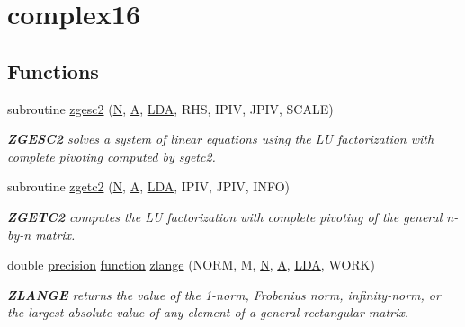 \hypertarget{group__complex16GEauxiliary}{}\section{complex16}
\label{group__complex16GEauxiliary}
\subsection*{Functions}
\begin{DoxyCompactItemize}
\item 
subroutine \hyperlink{group__complex16GEauxiliary_ga9adcef3bc45139ea3693275252880c29}{zgesc2} (\hyperlink{polmisc_8c_a0240ac851181b84ac374872dc5434ee4}{N}, \hyperlink{classA}{A}, \hyperlink{example__user_8c_ae946da542ce0db94dced19b2ecefd1aa}{L\+D\+A}, R\+H\+S, I\+P\+I\+V, J\+P\+I\+V, S\+C\+A\+L\+E)
\begin{DoxyCompactList}\small\item\em {\bfseries Z\+G\+E\+S\+C2} solves a system of linear equations using the L\+U factorization with complete pivoting computed by sgetc2. \end{DoxyCompactList}\item 
subroutine \hyperlink{group__complex16GEauxiliary_gae5d1dc8c626b248e836d865f428aa399}{zgetc2} (\hyperlink{polmisc_8c_a0240ac851181b84ac374872dc5434ee4}{N}, \hyperlink{classA}{A}, \hyperlink{example__user_8c_ae946da542ce0db94dced19b2ecefd1aa}{L\+D\+A}, I\+P\+I\+V, J\+P\+I\+V, I\+N\+F\+O)
\begin{DoxyCompactList}\small\item\em {\bfseries Z\+G\+E\+T\+C2} computes the L\+U factorization with complete pivoting of the general n-\/by-\/n matrix. \end{DoxyCompactList}\item 
double \hyperlink{numinquire_8h_a2c8e616467665d0b2814d4c1589ba74e}{precision} \hyperlink{afunc_8m_a7b5e596df91eadea6c537c0825e894a7}{function} \hyperlink{group__complex16GEauxiliary_ga7908bb12a6f02dbfa4d5a92a27c0e9b7}{zlange} (N\+O\+R\+M, M, \hyperlink{polmisc_8c_a0240ac851181b84ac374872dc5434ee4}{N}, \hyperlink{classA}{A}, \hyperlink{example__user_8c_ae946da542ce0db94dced19b2ecefd1aa}{L\+D\+A}, W\+O\+R\+K)
\begin{DoxyCompactList}\small\item\em {\bfseries Z\+L\+A\+N\+G\+E} returns the value of the 1-\/norm, Frobenius norm, infinity-\/norm, or the largest absolute value of any element of a general rectangular matrix. \end{DoxyCompactList}\item 

\end{DoxyCompactItemize}
